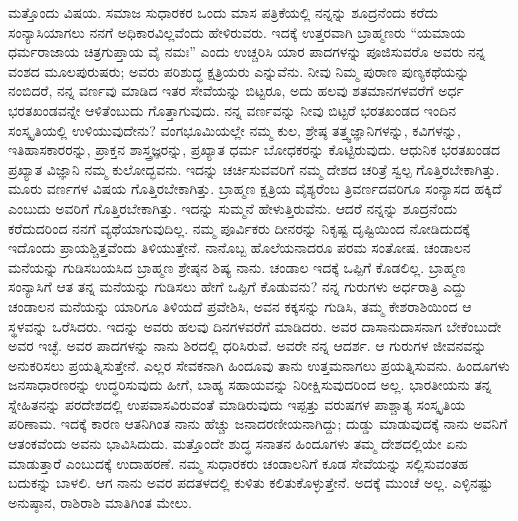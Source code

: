 ಮತ್ತೊಂದು ವಿಷಯ. ಸಮಾಜ ಸುಧಾರಕರ ಒಂದು ಮಾಸ ಪತ್ರಿಕೆಯಲ್ಲಿ ನನ್ನನ್ನು ಶೂದ್ರನೆಂದು ಕರೆದು ಸಂನ್ಯಾಸಿಯಾಗಲು ನನಗೆ ಅಧಿಕಾರವಿಲ್ಲವೆಂದು ಹೇಳಿರುವರು. ಇದಕ್ಕೆ ಉತ್ತರವಾಗಿ ಬ್ರಾಹ್ಮಣರು “ಯಮಾಯ ಧರ್ಮರಾಜಾಯ ಚಿತ್ರಗುಪ್ತಾಯ ವೈ ನಮಃ” ಎಂದು ಉಚ್ಚರಿಸಿ ಯಾರ ಪಾದಗಳನ್ನು ಪೂಜಿಸುವರೊ ಅವರು ನನ್ನ ವಂಶದ ಮೂಲಪುರುಷರು; ಅವರು ಪರಿಶುದ್ಧ ಕ್ಷತ್ರಿಯರು ಎನ್ನುವೆನು. ನೀವು ನಿಮ್ಮ ಪುರಾಣ ಪುಣ್ಯಕಥೆಯನ್ನು ನಂಬಿದರೆ, ನನ್ನ ವರ್ಣವು ಮಾಡಿದ ಇತರ ಸೇವೆಯನ್ನು ಬಿಟ್ಟರೂ, ಅದು ಹಲವು ಶತಮಾನಗಳವರೆಗೆ ಅರ್ಧ ಭರತಖಂಡವನ್ನೇ ಆಳಿತೆಂಬುದು ಗೊತ್ತಾಗುವುದು. ನನ್ನ ವರ್ಣವನ್ನು ನೀವು ಬಿಟ್ಟರೆ ಭರತಖಂಡದ ಇಂದಿನ ಸಂಸ್ಕೃತಿಯಲ್ಲಿ ಉಳಿಯುವುದೇನು? ವಂಗಭೂಮಿಯಲ್ಲೇ ನಮ್ಮ ಕುಲ, ಶ್ರೇಷ್ಠ ತತ್ತ್ವಜ್ಞಾನಿಗಳನ್ನು, ಕವಿಗಳನ್ನು, ಇತಿಹಾಸಕಾರರನ್ನು, ಪ್ರಾಕ್ತನ ಶಾಸ್ತ್ರಜ್ಞರನ್ನು, ಪ್ರಖ್ಯಾತ ಧರ್ಮ ಬೋಧಕರನ್ನು ಕೊಟ್ಟಿರುವುದು. ಆಧುನಿಕ ಭರತಖಂಡದ ಪ್ರಖ್ಯಾತ ವಿಜ್ಞಾನಿ ನಮ್ಮ ಕುಲೋದ್ಭವನು. ಇದನ್ನು ಚರ್ಚಿಸುವವರಿಗೆ ನಮ್ಮ ದೇಶದ ಚರಿತ್ರೆ ಸ್ವಲ್ಪ ಗೊತ್ತಿರಬೇಕಾಗಿತ್ತು. ಮೂರು ವರ್ಣಗಳ ವಿಷಯ ಗೊತ್ತಿರಬೇಕಾಗಿತ್ತು. ಬ್ರಾಹ್ಮಣ ಕ್ಷತ್ರಿಯ ವೈಶ್ಯರೆಂಬ ತ್ರಿವರ್ಣದವರಿಗೂ ಸಂನ್ಯಾಸದ ಹಕ್ಕಿದೆ ಎಂಬುದು ಅವರಿಗೆ ಗೊತ್ತಿರಬೇಕಾಗಿತ್ತು. ಇದನ್ನು ಸುಮ್ಮನೆ ಹೇಳುತ್ತಿರುವೆನು. ಆದರೆ ನನ್ನನ್ನು ಶೂದ್ರನೆಂದು ಕರೆದುದರಿಂದ ನನಗೆ ವ್ಯಥೆಯಾಗುವುದಿಲ್ಲ. ನಮ್ಮ ಪೂರ್ವಿಕರು ದೀನರನ್ನು ನಿಕೃಷ್ಟ ದೃಷ್ಟಿಯಿಂದ ನೋಡಿದುದಕ್ಕೆ ಇದೊಂದು ಪ್ರಾಯಶ್ಚಿತ್ತವೆಂದು ತಿಳಿಯುತ್ತೇನೆ. ನಾನೊಬ್ಬ ಹೊಲೆಯನಾದರೂ ಪರಮ ಸಂತೋಷ. ಚಂಡಾಲನ ಮನೆಯನ್ನು ಗುಡಿಸಬಯಸಿದ ಬ್ರಾಹ್ಮಣ ಶ್ರೇಷ್ಠನ ಶಿಷ್ಯ ನಾನು. ಚಂಡಾಲ ಇದಕ್ಕೆ ಒಪ್ಪಿಗೆ ಕೊಡಲಿಲ್ಲ. ಬ್ರಾಹ್ಮಣ ಸಂನ್ಯಾಸಿಗೆ ಆತ ತನ್ನ ಮನೆಯನ್ನು ಗುಡಿಸಲು ಹೇಗೆ ಒಪ್ಪಿಗೆ ಕೊಡುವನು? ನನ್ನ ಗುರುಗಳು ಅರ್ಧರಾತ್ರಿ ಎದ್ದು ಚಂಡಾಲನ ಮನೆಯನ್ನು ಯಾರಿಗೂ ತಿಳಿಯದೆ ಪ್ರವೇಶಿಸಿ, ಅವನ ಕಕ್ಕಸನ್ನು ಗುಡಿಸಿ, ತಮ್ಮ ಕೇಶರಾಶಿಯಿಂದ ಆ ಸ್ಥಳವನ್ನು ಒರೆಸಿದರು. ಇದನ್ನು ಅವರು ಹಲವು ದಿನಗಳವರೆಗೆ ಮಾಡಿದರು. ಅವರ ದಾಸಾನುದಾಸನಾಗ ಬೇಕೆಂಬುದೇ ಅವರ ಇಚ್ಛೆ. ಅವರ ಪಾದಗಳನ್ನು ನಾನು ಶಿರದಲ್ಲಿ ಧರಿಸಿರುವೆ. ಅವರೇ ನನ್ನ ಆದರ್ಶ. ಆ ಗುರುಗಳ ಜೀವನವನ್ನು ಅನುಕರಿಸಲು ಪ್ರಯತ್ನಿಸುತ್ತೇನೆ. ಎಲ್ಲರ ಸೇವಕನಾಗಿ ಹಿಂದೂವು ತಾನು ಉತ್ತಮ\-ನಾಗಲು ಪ್ರಯತ್ನಿಸುವನು. ಹಿಂದೂಗಳು ಜನಸಾಧಾರಣರನ್ನು ಉದ್ಧರಿಸುವುದು ಹೀಗೆ, ಬಾಹ್ಯ ಸಹಾಯವನ್ನು ನಿರೀಕ್ಷಿಸುವುದರಿಂದ ಅಲ್ಲ. ಭಾರತೀಯನು ತನ್ನ ಸ್ನೇಹಿತನನ್ನು ಪರದೇಶದಲ್ಲಿ ಉಪವಾಸವಿರುವಂತೆ ಮಾಡಿರುವುದು ಇಪ್ಪತ್ತು ವರುಷಗಳ ಪಾಶ್ಚಾತ್ಯ ಸಂಸ್ಕೃತಿಯ ಪರಿಣಾಮ. ಇದಕ್ಕೆ ಕಾರಣ ಆತನಿಗಿಂತ ನಾನು ಹೆಚ್ಚು ಜನಾದರಣೀಯನಾಗಿದ್ದು; ದುಡ್ಡು ಮಾಡುವುದಕ್ಕೆ ನಾನು ಅವನಿಗೆ ಆತಂಕವೆಂದು ಅವನು ಭಾವಿಸಿದುದು. ಮತ್ತೊಂದೇ ಶುದ್ಧ ಸನಾತನ ಹಿಂದೂಗಳು ತಮ್ಮ ದೇಶದಲ್ಲಿಯೇ ಏನು ಮಾಡುತ್ತಾರೆ ಎಂಬುದಕ್ಕೆ ಉದಾಹರಣೆ. ನಮ್ಮ ಸುಧಾರಕರು ಚಂಡಾಲನಿಗೆ ಕೂಡ ಸೇವೆಯನ್ನು ಸಲ್ಲಿಸುವಂತಹ ಬದುಕನ್ನು ಬಾಳಲಿ. ಆಗ ನಾನು ಅವರ ಪದತಳದಲ್ಲಿ ಕುಳಿತು ಕಲಿತುಕೊಳ್ಳುತ್ತೇನೆ. ಅದಕ್ಕೆ ಮುಂಚೆ ಅಲ್ಲ. ಎಳ್ಳಿನಷ್ಟು ಅನುಷ್ಠಾನ, ರಾಶಿರಾಶಿ ಮಾತಿಗಿಂತ ಮೇಲು.

